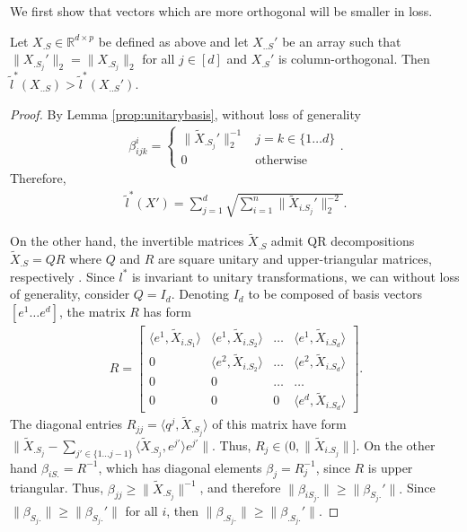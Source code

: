 \documentclass[a4paper,11pt]{article}
\begin{document}
We first show that vectors which are more orthogonal will be smaller in loss.

\begin{lemma}
\label{lemma:orthogonal}
Let $X_{.S} \in \mathbb R^{d \times p}$ be defined as above and let $X_{..S}'$ be an array such that $\|X_{.S_j}'\|_2 = \|X_{.S_j}\|_2$ for all $j \in [d]$ and $X_{.S}'$ is column-orthogonal.
Then $\tilde l^* (X_{..S}) > \tilde l^* (X_{..S}')$.
\end{lemma}
\begin{proof}

By Lemma \ref{prop:unitarybasis}, without loss of generality
\begin{eqnarray}
\beta_{ijk}^i = \begin{cases} \|\tilde X_{.S_j}'\|_2^{-1} & j = k \in \{ 1 \dots d\}  \\
0 & \text{otherwise}
\end{cases}.
\end{eqnarray}
Therefore,
\begin{eqnarray}
\tilde l^*(X') = \sum_{j = 1}^d \sqrt{\sum_{i = 1}^n \|\tilde X_{i.S_j}' \|_2^{-2}}.
\end{eqnarray}

On the other hand, the invertible matrices $\tilde X_{.S}$ admit QR decompositions $\tilde X_{.S} = QR$ where $Q$ and $R$ are square unitary and upper-triangular matrices, respectively \citep{Anderson1992-fb}.
Since $l^*$ is invariant to unitary transformations, we can without loss of generality, consider $Q= I_d$.
Denoting $I_d$ to be composed of basis vectors $[e^1 \dots e^d]$, the matrix $R$ has form
\begin{eqnarray}
R = \begin{bmatrix}
\langle e^1, \tilde X_{i.{S_1}} \rangle & \langle e^1, \tilde X_{i.{S_2}} \rangle  &\dots &  \langle e^1, \tilde X_{i.{S_d}} \rangle \\
0 & \langle e^2, \tilde X_{i.{S_2}} \rangle & \dots  &  \langle e^2, \tilde X_{i.{S_d}} \rangle\\
0 & 0 & \dots & \dots  \\
0 & 0 & 0& \langle e^d, \tilde X_{i.{S_d}} \rangle 
\end{bmatrix}.
\end{eqnarray}
The diagonal entries $R_{jj} = \langle q^j, \tilde X_{.{S_j}} \rangle$ of this matrix have form $\| \tilde X_{.{S_j}} -  \sum_{j' \in \{1 \dots j-1\}} \langle \tilde X_{.{S_{j}}}, e^{j'} \rangle e^{j'} \|$.
Thus, $R_{j} \in (0, \| \tilde X_{i.{S_j}}\|]$.
On the other hand $\beta_{iS.} =R^{-1}$, which has diagonal elements $\beta_{j} = R_{j}^{-1}$, since $R$ is upper triangular.
Thus, $\beta_{jj} \geq \| \tilde X_{.{S_j}}\|^{-1}$, and therefore $\|\beta_{iS_j.}\| \geq \|\beta_{S_j.}'\|.$
Since $\|\beta_{S_j.}\| \geq \|\beta_{S_j.}'\|$ for all $i$, then $\|\beta_{.S_j.}\| \geq \|\beta_{.S_j.}' \|$.
\end{proof}
\end{document}
